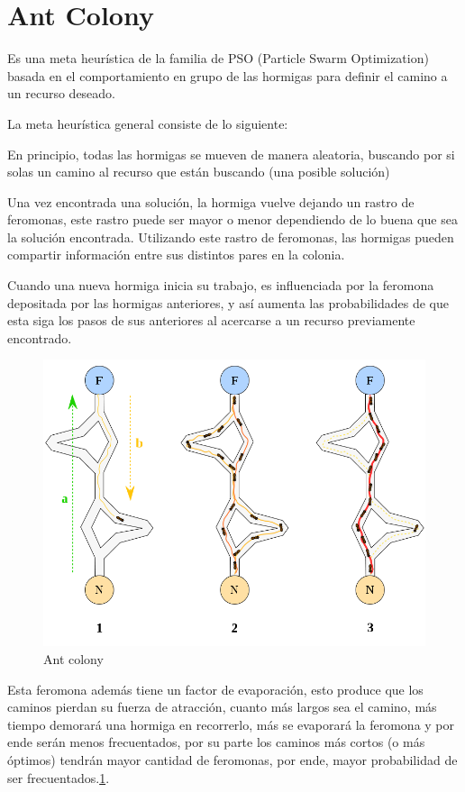 \documentclass[a4paper,spanish]{article}
\begin{document}
\clearpage


\section{Ant Colony}

Es una meta heurística de la familia de PSO (Particle Swarm Optimization) basada en el comportamiento en grupo 
de las hormigas para definir el camino a un recurso deseado.

La meta heurística general consiste de lo siguiente:

En principio, todas las hormigas se mueven de manera aleatoria, buscando por si solas un camino 
al recurso que están buscando (una posible solución)

Una vez encontrada una solución, la hormiga vuelve dejando un rastro de feromonas, 
este rastro puede ser mayor o menor dependiendo de lo buena que sea la solución encontrada.
Utilizando este rastro de feromonas, las hormigas pueden compartir información entre sus distintos 
pares en la colonia. 

Cuando una nueva hormiga inicia su trabajo, es influenciada por la feromona depositada por las hormigas 
anteriores, y así aumenta las probabilidades de que esta siga los pasos de sus anteriores al acercarse 
a un recurso previamente encontrado.

\begin{figure}
	\centering
	\includegraphics[scale=0.2]{./img/antscolonyalg.png}
	\caption{Ant colony}
	\label{img:ants}
\end{figure}

Esta feromona además tiene un factor de evaporación, esto produce que los caminos pierdan su 
fuerza de atracción, cuanto más largos sea el camino, más tiempo demorará una hormiga en recorrerlo, 
más se evaporará la feromona y por ende serán menos frecuentados, por su parte los caminos más cortos 
(o más óptimos) tendrán mayor cantidad de feromonas, por ende, mayor probabilidad de ser frecuentados.\ref{img:ants}.
\end{document}
